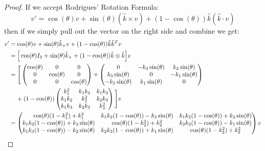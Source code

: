 \documentclass[12pt, letterpaper, onecolumn, conference, final]{IEEEtran}
\theoremstyle{definition}
\theoremstyle{plain}
\begin{document}
\begin{proof}
If we accept Rodrigues' Rotation Formula:
\begin{equation*}
v' = \cos(\theta)v + \sin(\theta)(\hat{k} \times v) + (1 - \cos(\theta))\hat{k}(\hat{k} \cdot v)
\end{equation*}
then if we simply pull out the vector on the right side and combine we get:
\begin{equation*}
\begin{split}
v' &= \cos(\theta)v + \sin(\theta)\hat{k}_{\times}v + (1 - \cos(\theta))\hat{k}\hat{k}^T v \\
&= \Big[ \cos(\theta)I_3 + \sin(\theta)\hat{k}_{\times} + (1 - \cos(\theta))\hat{k} \otimes \hat{k} \Big] v \\
&= \Bigg[ \begin{pmatrix}
\cos(\theta) & 0 & 0 \\
0 & \cos(\theta) & 0 \\
0 & 0 & \cos(\theta)
\end{pmatrix} + \begin{pmatrix}
0 & -k_3\sin(\theta) & k_2\sin(\theta) \\
k_3\sin(\theta) & 0 & -k_1\sin(\theta) \\
-k_2\sin(\theta) & k_1\sin(\theta) & 0
\end{pmatrix} \\
& \hspace{.4cm} + (1 - \cos(\theta))\begin{pmatrix}
k_1^2 & k_1k_2 & k_1k_3 \\
k_1k_2 & k_2^2 & k_2k_3 \\
k_1k_3 & k_2k_3 & k_3^2
\end{pmatrix} \Bigg] v \\
&= \begin{pmatrix}
\cos(\theta)(1 - k_1^2) + k_1^2 & k_1k_2(1 - \cos(\theta)) - k_3\sin(\theta) & k_1k_3(1 - \cos(\theta)) + k_2\sin(\theta) \\
k_1k_2(1 - \cos(\theta)) + k_3\sin(\theta) & \cos(\theta)(1 - k_2^2) + k_2^2 & k_2k_3(1 - \cos(\theta)) - k_1\sin(\theta) \\
k_1k_3(1 - \cos(\theta)) - k_2\sin(\theta) & k_2k_3(1 - \cos(\theta)) + k_1\sin(\theta) & \cos(\theta)(1 - k_3^2) + k_3^2
\end{pmatrix} v
\end{split}
\end{equation*}
\end{proof}
\end{document}
